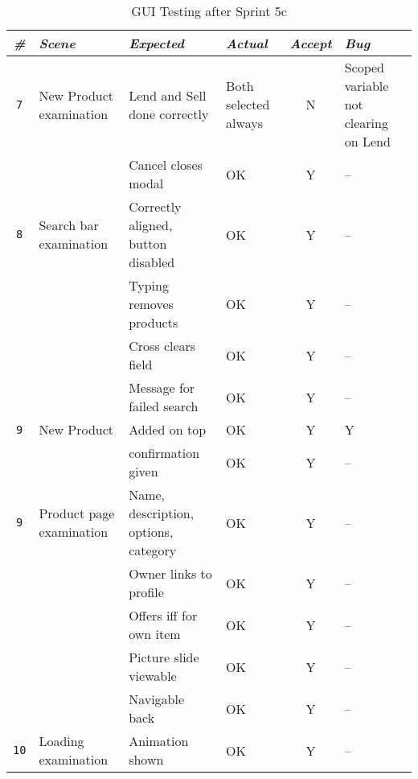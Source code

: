 \begin{sidewaystable}
\centering
    \begin{tabularx}{\textwidth}{cbbbcb}
    \toprule
    \centering
    \emph{\textbf{\#}} & \emph{\textbf{Scene}} & \emph{\textbf{Expected}} & \emph{\textbf{Actual}} & \emph{\textbf{Accept}} & \emph{\textbf{Bug}} \\
    \midrule
    \texttt{7}
    		& New Product examination
    		& Lend and Sell done correctly
    		& Both selected always
    		& N
    		& Scoped variable not clearing on Lend \\
    		\cline{3-6} \noalign{\smallskip}
    		&& Cancel closes modal
    		& OK
    		& Y
    		& --\\
    \midrule
    \texttt{8}
    		& Search bar examination
    		& Correctly aligned, button disabled
    		& OK
    		& Y
    		& -- \\
    		\cline{3-6} \noalign{\smallskip}
    		&& Typing removes products
    		& OK
    		& Y
    		& --\\
    		\cline{3-6} \noalign{\smallskip}
    		&& Cross clears field
    		& OK
    		& Y
    		& --\\
    		\cline{3-6} \noalign{\smallskip}
    		&& Message for failed search
    		& OK
    		& Y
    		& --\\
    	\midrule
    	\texttt{9}
    		& New Product
    		& Added on top
    		& OK
    		& Y
    		& Y \\
    		\cline{3-6} \noalign{\smallskip}
    		&& confirmation given
    		& OK
    		& Y
    		& --\\
    \midrule
    \texttt{9}
    		& Product page examination
    		& Name, description, options, category
    		& OK
    		& Y
    		& -- \\
    		\cline{3-6} \noalign{\smallskip}
    		&& Owner links to profile
    		& OK
    		& Y
    		& --\\
    		\cline{3-6} \noalign{\smallskip}
    		&& Offers iff for own item
    		& OK
    		& Y
    		& --\\
    		\cline{3-6} \noalign{\smallskip}
    		&& Picture slide viewable
    		& OK
    		& Y
    		& --\\
    		\cline{3-6} \noalign{\smallskip}
    		&& Navigable back
    		& OK
    		& Y
    		& --\\
    \midrule
    \texttt{10}
    		& Loading examination
    		& Animation shown
    		& OK
    		& Y
    		& -- \\
    \bottomrule
    \hline
    \end{tabularx}
    \caption{GUI Testing after Sprint 5c}
    \label{table:table:gui-test3}
\end{sidewaystable}

